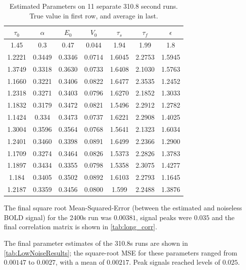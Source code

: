 \documentclass[journal]{./IEEEtran}
\begin{document}
\begin{table}[!t]
\renewcommand{\arraystretch}{1.3}
\centering
\begin{tabular}{|c | c | c | c | c | c | c | }
\hline
$\tau_0$ & $\alpha$ & $E_0$    & $V_0$    & $\tau_s$ & $\tau_f$ & $\epsilon$ \\
\hline
\rowcolor[gray]{.8}
1.45 & 0.3 & 0.47 & 0.044 & 1.94 & 1.99 & 1.8  \\
\hline
\hline
1.2221 & 0.3449 & 0.3346 & 0.0714 & 1.6045 & 2.2753 & 1.5945 \\
1.3749 & 0.3318 & 0.3630 & 0.0733 & 1.6408 & 2.1030 & 1.5763 \\
1.1660 & 0.3221 & 0.3406 & 0.0822 & 1.6477 & 2.3535 & 1.2452 \\
1.2318 & 0.3271 & 0.3403 & 0.0796 & 1.6270 & 2.1852 & 1.3033 \\
1.1832 & 0.3179 & 0.3472 & 0.0821 & 1.5496 & 2.2912 & 1.2782 \\
1.1424 & 0.334  & 0.3473 & 0.0737 & 1.6221 & 2.2908 & 1.4025 \\
1.3004 & 0.3596 & 0.3564 & 0.0768 & 1.5641 & 2.1323 & 1.6034 \\
1.2401 & 0.3460 & 0.3398 & 0.0891 & 1.6499 & 2.2366 & 1.2900 \\
1.1709 & 0.3274 & 0.3464 & 0.0826 & 1.5373 & 2.2826 & 1.3783 \\
1.1897 & 0.3434 & 0.3355 & 0.0798 & 1.5358 & 2.3075 & 1.4277 \\
1.184 &  0.3405 & 0.3502 & 0.0892 & 1.6103 & 2.2793 & 1.1645 \\
\hline
1.2187 & 0.3359 & 0.3456 & 0.0800 & 1.599 & 2.2488 & 1.3876 \\
\hline
\end{tabular}
\caption{Estimated Parameters on 11 separate 310.8 second runs. 
    True value in first row,
    and average in last.}
\label{tab:LowNoiseResults}
\end{table}

The final square root Mean-Squared-Error (between the estimated and 
noiseless BOLD signal) for the 2400s run was $0.00381$, signal
peaks were $0.035$
and the final correlation matrix is shown in \autoref{tab:long_corr}.

The final parameter estimates of the 310.8s runs are shown in
\autoref{tab:LowNoiseResults}; the square-root MSE for these
parameters ranged from $0.00147$ to $0.0027$, with a mean of 
$0.00217$. Peak signals reached levels of $0.025$.
\end{document}
